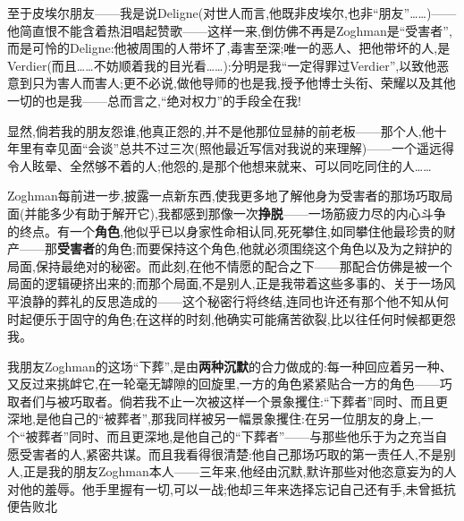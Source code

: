 \dmark{}至于皮埃尔朋友——我是说Deligne(对世人而言,他既非皮埃尔,也非“朋友”……)——他简直恨不能含着热泪唱起赞歌——这样一来,倒仿佛不再是Zoghman是“受害者”,而是可怜的Deligne:他被周围的人带坏了,毒害至深;唯一的恶人、把他带坏的人,是Verdier(而且……不妨顺着我的目光看……):分明是我“一定得罪过Verdier”,以致他恶意到只为害人而害人;更不必说,做他导师的也是我,授予他博士头衔、荣耀以及其他一切的也是我——总而言之,“绝对权力”的手段全在我!

显然,倘若我的朋友怨谁,他真正怨的,并不是他那位显赫的前老板——那个人,他十年里有幸见面“会谈”总共不过三次(照他最近写信对我说的来理解)——一个遥远得令人眩晕、全然够不着的人;他怨的,是那个他想来就来、可以同吃同住的人……

Zoghman每前进一步,披露一点新东西,使我更多地了解他身为受害者的那场巧取局面(并能多少有助于解开它),我都感到那像一次\textbf{挣脱}——一场筋疲力尽的内心斗争的终点。有一个\textbf{角色},他似乎已以身家性命相认同,死死攀住,如同攀住他最珍贵的财产——那\textbf{受害者}的角色\dmark{};而要保持这个角色,他就必须围绕这个角色以及为之辩护的局面,保持最绝对的秘密。而此刻,在他不情愿的配合之下——那配合仿佛是被一个局面的逻辑硬挤出来的;而那个局面,不是别人,正是我带着这些多事的、关于一场风平浪静的葬礼的反思造成的——这个秘密行将终结,连同也许还有那个他不知从何时起便乐于固守的角色;在这样的时刻,他确实可能痛苦欲裂,比以往任何时候都更怨我。

我朋友Zoghman的这场“下葬”,是由\textbf{两种沉默}的合力做成的:每一种回应着另一种、又反过来挑衅它,在一轮毫无罅隙的回旋里,一方的角色紧紧贴合一方的角色——巧取者们与被巧取者。倘若我不止一次被这样一个景象攫住:“下葬者”同时、而且更深地,是他自己的“被葬者”,那我同样被另一幅景象攫住:在另一位朋友的身上,一个“被葬者”同时、而且更深地,是他自己的“下葬者”——与那些他乐于为之充当自愿受害者的人,紧密共谋。而且我看得很清楚:他自己那场巧取的第一责任人,不是别人,正是我的朋友Zoghman本人——三年来,他经由沉默,默许那些对他恣意妄为的人对他的羞辱。他手里握有一切,可以一战;他却三年来选择忘记自己还有手,未曾抵抗便告败北

